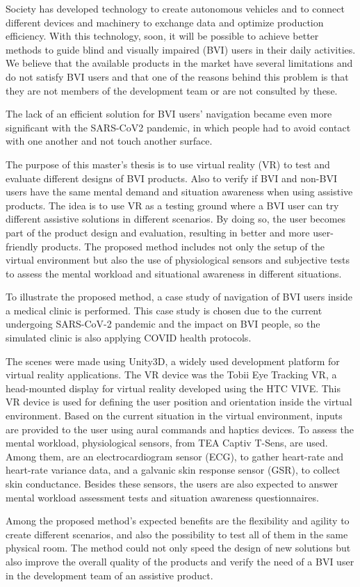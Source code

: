 
Society has developed technology to create autonomous vehicles and to connect different devices and machinery to exchange data and optimize production efficiency.  With this technology, soon, it will be possible to achieve better methods to guide blind and visually impaired (BVI) users in their daily activities. We believe that the available products in the market have several limitations and do not satisfy BVI users and that one of the reasons behind this problem is that they are not members of the development team or are not consulted by these.

The lack of an efficient solution for BVI users' navigation became even more significant with the SARS-CoV2 pandemic, in which people had to avoid contact with one another and not touch another surface.

The purpose of this master's thesis is to use virtual reality (VR) to test and evaluate different designs of BVI products. Also to verify if BVI and non-BVI users have the same mental demand and situation awareness when using assistive products. The idea is to use VR as a testing ground where a BVI user can try different assistive solutions in different scenarios. By doing so, the user becomes part of the product design and evaluation, resulting in better and more user-friendly products. The proposed method includes not only the setup of the virtual environment but also the use of physiological sensors and subjective tests to assess the mental workload and situational awareness in different situations.

To illustrate the proposed method, a case study of navigation of BVI users inside a medical clinic is performed. This case study is chosen due to the current undergoing SARS-CoV-2 pandemic and the impact on BVI people, so the simulated clinic is also applying COVID health protocols.

The scenes were made using Unity3D, a widely used development platform for virtual reality applications. The VR device was the Tobii Eye Tracking VR, a head-mounted display for virtual reality developed using the HTC VIVE. This VR device is used for defining the user position and orientation inside the virtual environment. Based on the current situation in the virtual environment, inputs are provided to the user using aural commands and haptics devices. To assess the mental workload, physiological sensors, from TEA Captiv T-Sens, are used. Among them, are an electrocardiogram sensor (ECG), to gather heart-rate and heart-rate variance data, and a galvanic skin response sensor (GSR), to collect skin conductance. Besides these sensors, the users are also expected to answer mental workload assessment tests and situation awareness questionnaires.

Among the proposed method's expected benefits are the flexibility and agility to create different scenarios, and also the possibility to test all of them in the same physical room. The method could not only speed the design of new solutions but also improve the overall quality of the products and verify the need of a BVI user in the development team of an assistive product.